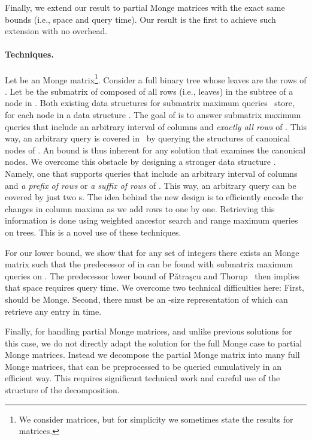 \documentclass{llncs}
\begin{document}
Finally, we extend our result to partial Monge matrices with the exact
same bounds (i.e.,  space and  query time). Our
result is the first to achieve such extension with no overhead. 



\paragraph{\bf Techniques.} 
Let  be an  Monge matrix\footnote{We consider  matrices, but for simplicity we sometimes state the
results for  matrices.}. Consider a full binary tree
 whose leaves are the rows of . Let  be the
submatrix of  composed of all rows (i.e., leaves) in the subtree of
a node  in .
Both existing data structures for submatrix maximum queries~\cite{ourICALP,KaplanMozesNussbaumSharir} store, for each node  in  a data structure . The goal of  is to answer submatrix maximum queries  that include an arbitrary interval of columns and {\em exactly all rows}  of .   
This way, an arbitrary query is covered
in~\cite{ourICALP,KaplanMozesNussbaumSharir} by querying the  structures of  canonical nodes of .  An  bound is thus inherent for any solution that examines the canonical nodes. 
We overcome this obstacle by designing a stronger data
structure . Namely, one that supports  queries
that include an arbitrary interval of columns and {\em a prefix of
  rows} or {\em a suffix of rows} of . 
This way, an arbitrary query can be covered by just two s. The
idea behind the new design  is to efficiently  encode the changes in column maxima as we add rows to  one by one. Retrieving this information is done using weighted ancestor search and range maximum queries on trees. This is a novel use of these techniques.     

For our lower bound, we show that for any set of  integers
 there exists an  Monge matrix  such that the predecessor of  in 
can be found with submatrix maximum queries on . 
The predecessor lower bound of
P{\v{a}}tra{\c{s}}cu and Thorup~\cite{PT2006} then implies that  space requires   query time. 
We overcome two technical
difficulties here: First,  should be Monge. Second, there must be an  -size representation of  which can retrieve any entry  in  time. 

Finally, for handling partial Monge matrices, and unlike previous
solutions for this case, we do not directly adapt the solution for the
full Monge case to partial Monge matrices. Instead we decompose the partial Monge matrix into
many full Monge matrices, that can be preprocessed to be queried
cumulatively in an efficient way. This requires significant technical work and
careful use of the structure of the decomposition.
\end{document}
